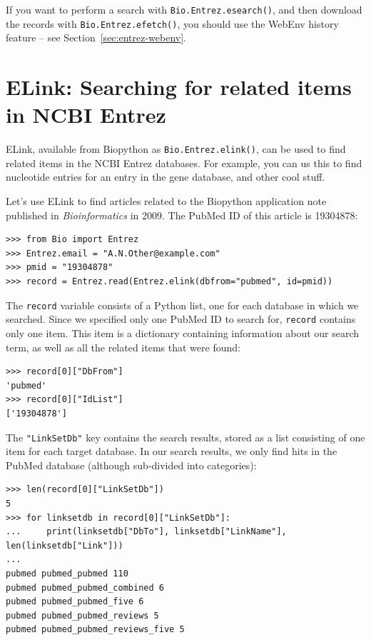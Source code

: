 \documentclass{report}
\begin{document}
If you want to perform a search with \verb|Bio.Entrez.esearch()|, and then download the records with \verb|Bio.Entrez.efetch()|, you should use the WebEnv history feature -- see Section~\ref{sec:entrez-webenv}.

\section{ELink: Searching for related items in NCBI Entrez}
\label{sec:elink}

ELink, available from Biopython as \verb+Bio.Entrez.elink()+, can be used to find related items in the NCBI Entrez databases. For example, you can us this to find nucleotide entries for an entry in the gene database,
and other cool stuff.

Let's use ELink to find articles related to the Biopython application note published in \textit{Bioinformatics} in 2009. The PubMed ID of this article is 19304878:

\begin{verbatim}
>>> from Bio import Entrez
>>> Entrez.email = "A.N.Other@example.com"
>>> pmid = "19304878"
>>> record = Entrez.read(Entrez.elink(dbfrom="pubmed", id=pmid))
\end{verbatim}

The \verb+record+ variable consists of a Python list, one for each database in which we searched. Since we specified only one PubMed ID to search for, \verb+record+ contains only one item. This item is a dictionary containing information about our search term, as well as all the related items that were found:

\begin{verbatim}
>>> record[0]["DbFrom"]
'pubmed'
>>> record[0]["IdList"]
['19304878']
\end{verbatim}

The \verb+"LinkSetDb"+ key contains the search results, stored as a list consisting of one item for each target database. In our search results, we only find hits in the PubMed database (although sub-divided into categories):

\begin{verbatim}
>>> len(record[0]["LinkSetDb"])
5
>>> for linksetdb in record[0]["LinkSetDb"]:
...     print(linksetdb["DbTo"], linksetdb["LinkName"], len(linksetdb["Link"]))
... 
pubmed pubmed_pubmed 110
pubmed pubmed_pubmed_combined 6
pubmed pubmed_pubmed_five 6
pubmed pubmed_pubmed_reviews 5
pubmed pubmed_pubmed_reviews_five 5
\end{verbatim}
\end{document}
